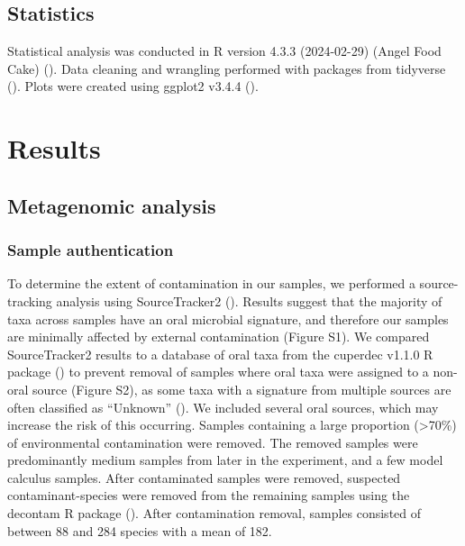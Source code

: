 \documentclass[
  b5paper,
]{book}
\begin{document}
\subsection{Statistics}\label{statistics}

Statistical analysis was conducted in R version 4.3.3 (2024-02-29)
(Angel Food Cake) (). Data
cleaning and wrangling performed with packages from tidyverse
(). Plots were created
using ggplot2 v3.4.4 ().

\section{Results}\label{results}

\subsection{Metagenomic analysis}\label{metagenomic-analysis}

\subsubsection{Sample authentication}\label{sample-authentication}

To determine the extent of contamination in our samples, we performed a
source-tracking analysis using SourceTracker2
(). Results
suggest that the majority of taxa across samples have an oral microbial
signature, and therefore our samples are minimally affected by external
contamination (Figure S1). We compared SourceTracker2 results to a
database of oral taxa from the cuperdec v1.1.0 R package
() to
prevent removal of samples where oral taxa were assigned to a non-oral
source (Figure S2), as some taxa with a signature from multiple sources
are often classified as ``Unknown''
(). We
included several oral sources, which may increase the risk of this
occurring. Samples containing a large proportion (\textgreater70\%) of
environmental contamination were removed. The removed samples were
predominantly medium samples from later in the experiment, and a few
model calculus samples. After contaminated samples were removed,
suspected contaminant-species were removed from the remaining samples
using the decontam R package (). After contamination removal, samples consisted of between 88 and
284 species with a mean of 182.
\end{document}
